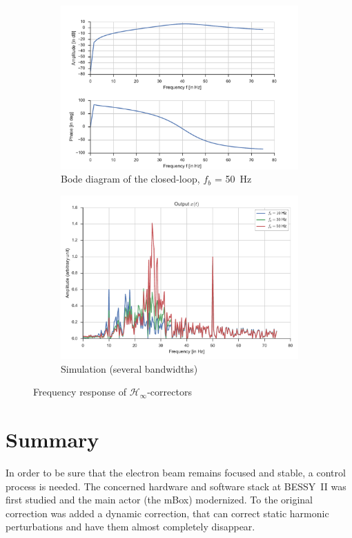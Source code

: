 \begin{figure}
    \centering
    \begin{subfigure}{0.49\textwidth}
        \includegraphics[width=\textwidth]{img/ctl_freqresp_hinf}
        \caption{\label{fig:ctl_freqresp_hinf} Bode diagram of the closed-loop, $f_b$ = \SI{50}{Hz}}
    \end{subfigure}
    \hfill
    \begin{subfigure}{0.49\textwidth}
        \includegraphics[width=\textwidth]{img/ctl_sim_hinf}
        \caption{\label{fig:ctl_sim_hinf}Simulation (several bandwidths)}
    \end{subfigure}    
    \caption{Frequency response of $\mathcal{H}_\infty$-correctors}
\end{figure}

\section{Summary}
In order to be sure that the electron beam remains focused and stable, a control process is needed. The concerned hardware and software stack at BESSY~II was first studied and the main actor (the mBox) modernized. To the original correction was added a dynamic correction, that can correct static harmonic perturbations and have them almost completely disappear.

